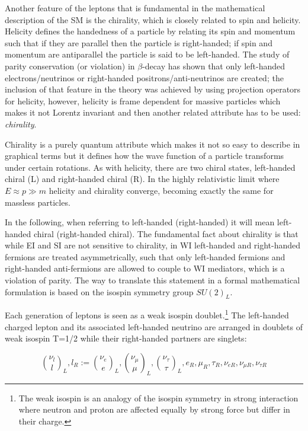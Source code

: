 Another feature of the leptons that is fundamental in the mathematical description of the SM is the chirality, which is closely related to spin and helicity. Helicity defines the handedness of a particle by relating its spin and momentum such that if they are parallel then the particle is right-handed; if spin and momentum are antiparallel the particle is said to be left-handed. The study of parity conservation (or violation) in $\beta$-decay has shown that only left-handed electrons/neutrinos or right-handed positrons/anti-neutrinos are created\cite{goldhaber}; the inclusion of that feature in the theory was achieved by using projection operators for helicity, however, helicity is frame dependent for massive particles which makes it not Lorentz invariant and then another related attribute has to be used: \textit{chirality}.

Chirality is a purely quantum attribute which makes it not so easy to describe in graphical terms but it defines how the wave function of a particle transforms under certain rotations. As with helicity, there are two chiral states, left-handed chiral (L) and right-handed chiral (R). In the highly relativistic limit where $E\approx p \gg m$ helicity and chirality converge, becoming exactly the same for massless particles.

In the following, when referring to left-handed (right-handed) it will mean left-handed chiral (right-handed chiral). The fundamental fact about chirality is that while EI and SI are not sensitive to chirality, in WI left-handed and right-handed fermions are treated asymmetrically, such that only left-handed fermions and right-handed anti-fermions are allowed to couple to WI mediators, which is a violation of parity. The way to translate this statement in a formal mathematical formulation is based on the isospin symmetry group $SU(2)_L$.

Each generation of leptons is seen as a weak isospin doublet.\footnote{The weak isospin is an analogy of the isospin symmetry in strong interaction where neutron and proton are affected equally by strong force but differ in their charge.} The left-handed charged lepton and its associated left-handed neutrino are arranged in doublets of weak isospin T=1/2 while their right-handed partners are singlets:

\begin{equation}
\binom{\nu_l}{l}_L , l_R := \binom{\nu_e}{e}_L , \binom{\nu_\mu}{\mu}_L, \binom{\nu_\tau}{\tau}_L, e_R, \mu_R, \tau_R, \nu_{eR}, \nu_{\mu R}, \nu_{\tau R}
\label{lepton_multiplets}
\end{equation}

